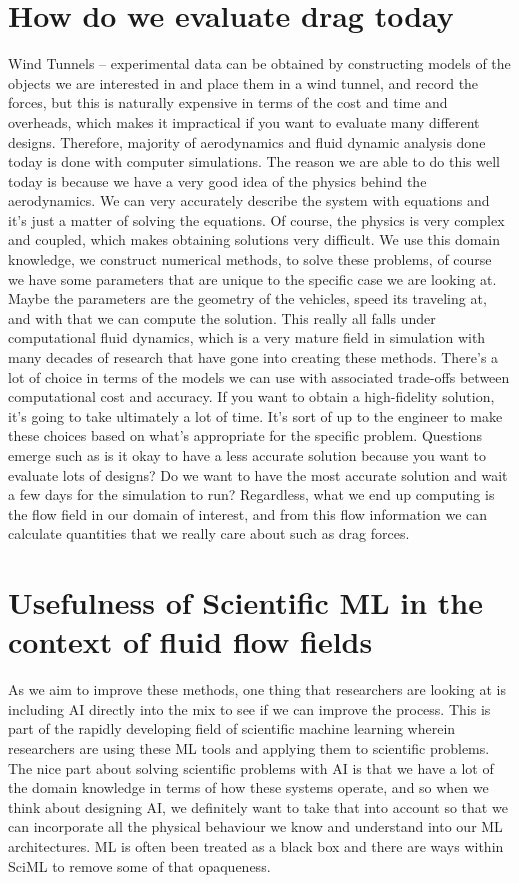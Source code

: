 \section{How do we evaluate drag today}
Wind Tunnels -- experimental data can be obtained by constructing models of the objects we are interested in and place them in a wind tunnel, and record the forces, but this is naturally expensive in terms of the cost and time and overheads, which makes it impractical if you want to evaluate many different designs. Therefore, majority of aerodynamics and fluid dynamic analysis done today is done with computer simulations. The reason we are able to do this well today is because we have a very good idea of the physics behind the aerodynamics. We can very accurately describe the system with equations and it's just a matter of solving the equations. Of course, the physics is very complex and coupled, which makes obtaining solutions very difficult. We use this domain knowledge, we construct numerical methods, to solve these problems, of course we have some parameters that are unique to the specific case we are looking at. Maybe the parameters are the geometry of the vehicles, speed its traveling at, and with that we can compute the solution. This really all falls under computational fluid dynamics, which is a very mature field in simulation with many decades of research that have gone into creating these methods. There's a lot of choice in terms of the models we can use with associated trade-offs between computational cost and accuracy. If you want to obtain a high-fidelity solution, it's going to take ultimately a lot of time. It's sort of up to the engineer to make these choices based on what's appropriate for the specific problem. Questions emerge such as is it okay to have a less accurate solution because you want to evaluate lots of designs? Do we want to have the most accurate solution and wait a few days for the simulation to run? Regardless, what we end up computing is the flow field in our domain of interest, and from this flow information we can calculate quantities that we really care about such as drag forces. 

\section{Usefulness of Scientific ML in the context of fluid flow fields}
As we aim to improve these methods, one thing that researchers are looking at is including AI directly into the mix to see if we can improve the process. This is part of the rapidly developing field of scientific machine learning wherein researchers are using these ML tools and applying them to scientific problems. The nice part about solving scientific problems with AI is that we have a lot of the domain knowledge in terms of how these systems operate, and so when we think about designing AI, we definitely want to take that into account so that we can incorporate all the physical behaviour we know and understand into our ML architectures. ML is often been treated as a black box and there are ways within SciML to remove some of that opaqueness. 

